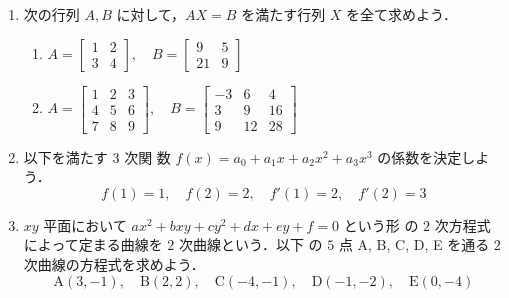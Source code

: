 \documentclass[11pt, uplatex, dvipdfmx]{jsarticle}
\begin{document}
\begin{enumerate}[label=\ref{sec:system}.\arabic*]

  \setlength{\itemsep}{1zh}


\item 次の行列 $A, B$ に対して，$AX=B$ を満たす行列 $X$ を全て求めよう．

  \vspace{1ex}
  
  \begin{enumerate}[label=(\arabic*)]
    \setlength{\itemsep}{1zh}
    
  \item $A= \left[
      \begin{array}{rr}
        1 & 2\\
        3 & 4
      \end{array}
    \right] , \quad B=\left[
      \begin{array}{rr}
        9 & 5\\
        21 & 9
      \end{array}
    \right]$

  \item $A=\left[
      \begin{array}{ccc}
        1 & 2 & 3\\
        4 & 5 & 6\\
        7 & 8 & 9
      \end{array}
    \right], \quad B=\left[
      \begin{array}{rrr}
        -3 & 6 & 4\\
        3 & 9 & 16\\
        9 & 12 & 28
      \end{array}
    \right]$
  \end{enumerate}

\item 以下を満たす $3$ 次関
  数 $f(x)=a_0 + a_1 x + a_2 x^2 + a_3 x^3$ の係数を決定しよう．
  \[
    f(1)=1, \quad f(2)=2, \quad f'(1)=2, \quad f'(2)=3
  \]
  
\item $xy$ 平面において $a x^2 + bxy + cy^2 + dx + ey + f=0$ という形
  の $2$ 次方程式によって定まる曲線を $2$ 次曲線という．以下
  の $5$ 点 A, B, C, D, E を通る $2$ 次曲線の方程式を求めよう．
  \[
    \textrm{A}(3,-1), \quad \textrm{B}(2,2), \quad \textrm{C}(-4,-1),
    \quad \textrm{D}(-1,-2), \quad \textrm{E}(0,-4)
  \]


\end{enumerate}
\end{document}
